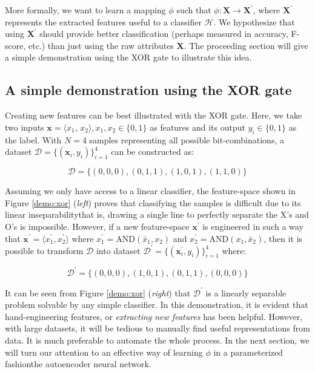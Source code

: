 \par More formally, we want to learn a mapping $\phi$ such that $\phi:
\mathbf{X} \rightarrow \mathbf{X}^{\prime}$, where $\mathbf{X}^{\prime}$
represents the extracted features useful to a classifier $\mathcal{H}$. We
hypothesize that using $\mathbf{X}^{\prime}$ should provide better
classification (perhaps measured in accuracy, F-score, etc.) than just using
the raw attributes $\mathbf{X}$. The proceeding section will give a
simple demonstration using the XOR gate to illustrate this idea.

\subsection{A simple demonstration using the XOR gate}

\par Creating new features can be best illustrated with the XOR gate. Here,
we take two inputs $\mathbf{x} = \langle x_{1}$, $x_{2} \rangle, x_1, x_2
\in \{0,1\}$ as features and its output $y_{i} \in \{0,1\}$ as the label.
With $N=4$ samples representing all possible bit-combinations, a dataset
$\mathcal{D}=\{(\mathbf{x}_{i}, y_{i})\}_{i=1}^{4}$ can be constructed as:

\[
    \mathcal{D} = \{(0,0,0), (0,1,1), (1,0,1), (1,1,0)\}
\]

Assuming we only have access to a linear classifier, the feature-space shown
in Figure \ref{demo:xor} (\textit{left}) proves that classifying the samples
is difficult due to its linear inseparability\textemdash that is, drawing a
single line to perfectly separate the X's and O's is impossible.
However, if a new feature-space $\mathbf{x}^{\prime}$ is engineered in such a
way that $\mathbf{x}^{\prime} = \langle {x}^{\prime}_{1}, {x}^{\prime}_2 \rangle$ where 
$x^{\prime}_{1} = \text{AND}(\bar{x}_{1}, x_{2})$ and $x^{\prime}_{2}
= \text{AND}(x_{1}, \bar{x}_{2})$, then it is possible to transform $\mathcal{D}$
into dataset $\mathcal{D}^{\prime}=\{(\mathbf{x}^{\prime}_{i}, y_{i})\}_{i=1}^{4}$
where:

\[
    \mathcal{D}^{\prime} = \{(0,0,0), (1,0,1), (0,1,1), (0,0,0)\}
\]

\par It can be seen from Figure \ref{demo:xor} (\textit{right}) that
$\mathcal{D}^{\prime}$ is a linearly separable problem solvable by any simple
classifier. In this demonstration, it is evident that hand-engineering
features, or \textit{extracting new features} has been helpful. However, with
large datasets, it will be tedious to manually find useful representations
from data. It is much preferable to automate the whole process. In the next section,
we will turn our attention to an effective way of learning $\phi$ in a
parameterized fashion\textemdash the autoencoder neural network.

